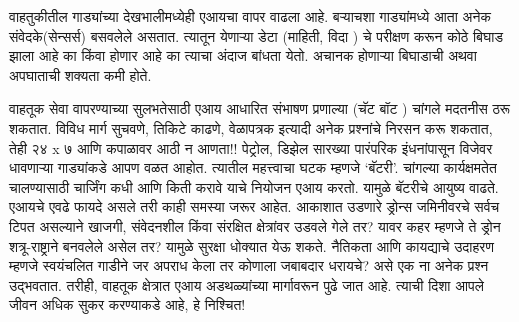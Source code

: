 वाहतुकीतील गाड्यांच्या देखभालीमध्येही एआयचा वापर वाढला आहे. बऱ्याचशा गाड्यांमध्ये आता अनेक संवेदके(सेन्सर्स) बसवलेले असतात. त्यातून येणाऱ्या डेटा (माहिती, विदा ) चे परीक्षण करून कोठे बिघाड झाला आहे का किंवा होणार आहे का त्याचा अंदाज बांधता येतो. अचानक होणाऱ्या बिघाडाची अथवा अपघाताची शक्यता कमी होते.

वाहतूक सेवा वापरण्याच्या सुलभतेसाठी एआय आधारित संभाषण प्रणाल्या (चॅट बॉट ) चांगले मदतनीस ठरू शकतात. विविध मार्ग सुचवणे, तिकिटे काढणे, वेळापत्रक इत्यादी अनेक प्रश्नांचे निरसन करू शकतात, तेही २४ x ७ आणि कपाळावर आठी न आणता!! पेट्रोल, डिझेल सारख्या पारंपरिक इंधनांपासून विजेवर धावणाऱ्या गाड्यांकडे आपण वळत आहोत. त्यातील महत्त्वाचा घटक म्हणजे `बॅटरी'. चांगल्या कार्यक्षमतेत चालण्यासाठी चार्जिंग कधी आणि किती करावे याचे नियोजन एआय करतो. यामुळे बॅटरीचे आयुष्य वाढते. एआयचे एवढे फायदे असले तरी काही समस्या जरूर आहेत. आकाशात उडणारे ड्रोन्स जमिनीवरचे सर्वच टिपत असल्याने खाजगी, संवेदनशील किंवा संरक्षित क्षेत्रांवर उडवले गेले तर? यावर कहर म्हणजे ते ड्रोन शत्रू-राष्ट्राने बनवलेले असेल तर? यामुळे सुरक्षा धोक्यात येऊ शकते. नैतिकता आणि कायद्याचे उदाहरण म्हणजे स्वयंचलित गाडीने जर अपराध केला तर कोणाला जबाबदार धरायचे? असे एक ना अनेक प्रश्न उद्भवतात. तरीही, वाहतूक क्षेत्रात एआय अडथळ्यांच्या मार्गावरून पुढे जात आहे. त्याची दिशा आपले जीवन अधिक सुकर करण्याकडे आहे, हे निश्चित!